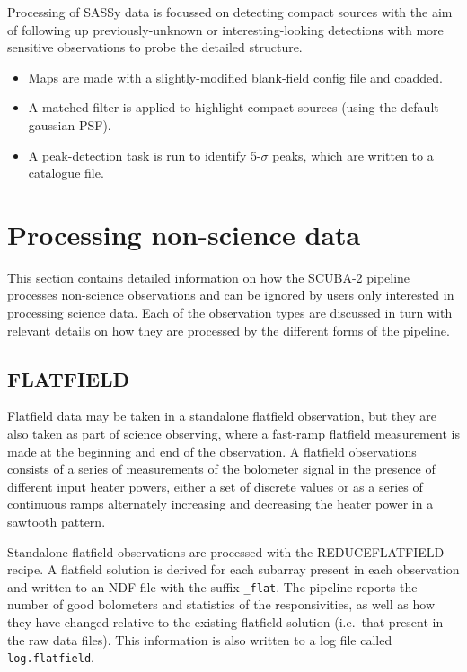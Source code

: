 \documentclass[twoside,11pt]{article}
\newcommand{\xlabel}[1]{}
\renewcommand{\_}{\texttt{\symbol{95}}}
\newcommand{\task}[1]{\textsf{#1}}
\begin{document}
Processing of SASSy data is focussed on detecting compact sources with
the aim of following up previously-unknown or interesting-looking
detections with more sensitive observations to probe the detailed
structure.

\begin{itemize}
\item Maps are made with a slightly-modified blank-field config file
  and coadded.
\item A matched filter is applied to highlight compact sources (using
  the default gaussian PSF).
\item A peak-detection task is run to identify 5-$\sigma$ peaks, which
  are written to a catalogue file.
\end{itemize}

\section{\xlabel{nonscience}Processing non-science data\label{se:nonsci}}

This section contains detailed information on how the SCUBA-2 pipeline
processes non-science observations and can be ignored by users only
interested in processing science data. Each of the observation types
are discussed in turn with relevant details on how they are processed
by the different forms of the pipeline.

\subsection{FLATFIELD}

Flatfield data may be taken in a standalone flatfield observation, but
they are also taken as part of science observing, where a fast-ramp
flatfield measurement is made at the beginning and end of the
observation. A flatfield observations consists of a series of
measurements of the bolometer signal in the presence of different
input heater powers, either a set of discrete values or as a series of
continuous ramps alternately increasing and decreasing the heater
power in a sawtooth pattern.

Standalone flatfield observations are processed with the
\task{REDUCE\_FLATFIELD} recipe. A flatfield solution is derived for
each subarray present in each observation and written to an NDF file
with the suffix \verb+_flat+. The pipeline reports the number of good
bolometers and statistics of the responsivities, as well as how they
have changed relative to the existing flatfield solution (i.e.\ that
present in the raw data files). This information is also written to a
log file called \verb+log.flatfield+.
\end{document}

